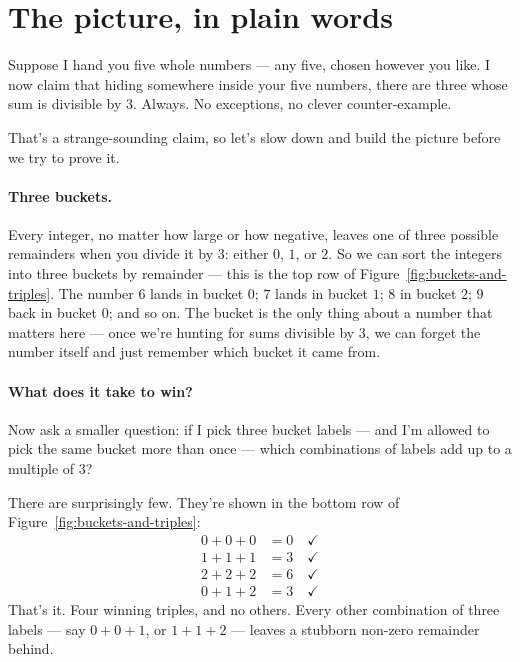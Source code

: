
\section{The picture, in plain words}
\label{sec:intro}

Suppose I hand you five whole numbers --- any five, chosen however you
like. I now claim that hiding somewhere inside your five numbers, there
are three whose sum is divisible by $3$. Always. No exceptions, no
clever counter-example.

That's a strange-sounding claim, so let's slow down and build the
picture before we try to prove it.

\paragraph{Three buckets.}
Every integer, no matter how large or how negative, leaves one of three
possible remainders when you divide it by $3$: either $0$, $1$, or $2$.
So we can sort the integers into three buckets by remainder --- this is
the top row of Figure~\ref{fig:buckets-and-triples}. The number $6$
lands in bucket $0$; $7$ lands in bucket $1$; $8$ in bucket $2$; $9$
back in bucket $0$; and so on. The bucket is the only thing about a
number that matters here --- once we're hunting for sums divisible by
$3$, we can forget the number itself and just remember which bucket it
came from.

\paragraph{What does it take to win?}
Now ask a smaller question: if I pick three bucket labels --- and I'm
allowed to pick the same bucket more than once --- which combinations
of labels add up to a multiple of $3$?

There are surprisingly few. They're shown in the bottom row of
Figure~\ref{fig:buckets-and-triples}:
\begin{align*}
  0 + 0 + 0 &= 0 \quad\checkmark \\
  1 + 1 + 1 &= 3 \quad\checkmark \\
  2 + 2 + 2 &= 6 \quad\checkmark \\
  0 + 1 + 2 &= 3 \quad\checkmark
\end{align*}
That's it. Four winning triples, and no others. Every other combination
of three labels --- say $0+0+1$, or $1+1+2$ --- leaves a stubborn
non-zero remainder behind.

